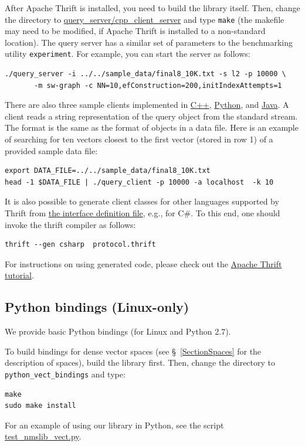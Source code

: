 \documentclass[runningheads,a4paper]{llncs}
\newcommand{\replocfile}{https://github.com/searchivarius/NonMetricSpaceLib/blob/pserv/}
\newcommand{\ttt}[1]{\texttt{#1}}
\begin{document}
{After Apache Thrift is installed, you need to build the library itself. Then, change the directory
to \href{\replocfile query_server/cpp_client_server}{query\_server/cpp\_client\_server} and type \ttt{make} (the makefile 
may need to be modified, if Apache Thrift is installed to a non-standard location).
The query server has a similar set of parameters to the benchmarking utility \ttt{experiment}.  For example,
you can start the server as follows:
\begin{verbatim}
./query_server -i ../../sample_data/final8_10K.txt -s l2 -p 10000 \
       -m sw-graph -c NN=10,efConstruction=200,initIndexAttempts=1
\end{verbatim}

There are also three sample clients implemented in \href{\replocfile query_server/cpp_client_server}{C++}, \href{\replocfile query_server/python_client/}{Python},
and \href{\replocfile query_server/java_client/}{Java}. 
A client reads a string representation of the query object from the standard stream.
The format is the same as the format of objects in a data file. 
Here is an example of searching for ten vectors closest to the first vector (stored in row 1) of a provided sample data file:
\begin{verbatim}
export DATA_FILE=../../sample_data/final8_10K.txt
head -1 $DATA_FILE | ./query_client -p 10000 -a localhost  -k 10
\end{verbatim}

It is also possible to generate client classes for other languages supported by Thrift from 
\href{\replocfile query_server/protocol.thrift}{the interface definition file}, e.g., for C\#. To this end, one should invoke the thrift compiler as follows:
\begin{verbatim}
thrift --gen csharp  protocol.thrift
\end{verbatim}
For instructions on using generated code, please check out the \href{https://thrift.apache.org/tutorial/}{Apache Thrift tutorial}.

\subsection{Python bindings (Linux-only)}\label{SectionPythonBind}
We provide basic Python bindings (for Linux and Python 2.7). 


To build bindings for dense vector spaces (see \S~\ref{SectionSpaces} for the description of spaces), build the library first.
Then, change the directory to \ttt{python\_vect\_bindings} and type:
\begin{verbatim}
make
sudo make install
\end{verbatim} 
For an example of using our library in Python, see the script  \href{\replocfile python_vect_bindings/test_nmslib_vect.py}{test\_nmslib\_vect.py}.

}
\end{document}
